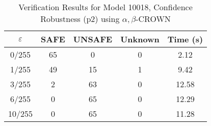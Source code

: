 \begin{table}[htbp]
\centering
\caption{Verification Results for Model 10018, Confidence Robustness (p2) using $\alpha,\beta$-CROWN}
\label{tab:model10018_p2_abcrown}
\begin{tabular}{|c|c|c|c|c|}
\hline
$\varepsilon$ & SAFE & UNSAFE & Unknown & Time (s) \\ \hline
0/255 & 65 & 0 & 0 & 2.12 \\ \hline
1/255 & 49 & 15 & 1 & 9.42 \\ \hline
3/255 & 2 & 63 & 0 & 12.58 \\ \hline
6/255 & 0 & 65 & 0 & 12.29 \\ \hline
10/255 & 0 & 65 & 0 & 11.28 \\ \hline
\end{tabular}
\end{table}
